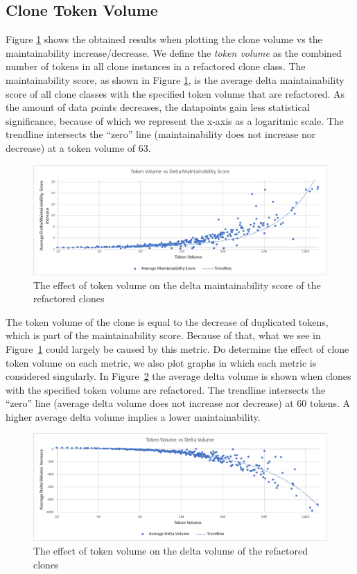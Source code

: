 \subsection{Clone Token Volume}
Figure \ref{fig:maintainabilityscore} shows the obtained results when plotting the clone volume vs the maintainability increase/decrease. We define the \textit{token volume} as the combined number of tokens in all clone instances in a refactored clone class. The maintainability score, as shown in Figure \ref{fig:maintainabilityscore}, is the average delta maintainability score of all clone classes with the specified token volume that are refactored. As the amount of data points decreases, the datapoints gain less statistical significance, because of which we represent the x-axis as a logaritmic scale. The trendline intersects the ``zero'' line (maintainability does not increase nor decrease) at a token volume of 63.

\begin{figure}[H]
  \includegraphics[width=1\textwidth]{img/maintainabilityscore}
  \caption{The effect of token volume on the delta maintainability score of the refactored clones}
  \label{fig:maintainabilityscore}
\end{figure}

The token volume of the clone is equal to the decrease of duplicated tokens, which is part of the maintainability score. Because of that, what we see in Figure~\ref{fig:maintainabilityscore} could largely be caused by this metric. Do determine the effect of clone token volume on each metric, we also plot graphs in which each metric is considered singularly. In Figure~\ref{fig:volume} the average delta volume is shown when clones with the specified token volume are refactored. The trendline intersects the ``zero'' line (average delta volume does not increase nor decrease) at 60 tokens. A higher average delta volume implies a lower maintainability.

\begin{figure}[H]
  \includegraphics[width=1\textwidth]{img/volume}
  \caption{The effect of token volume on the delta volume of the refactored clones}
  \label{fig:volume}
\end{figure}

